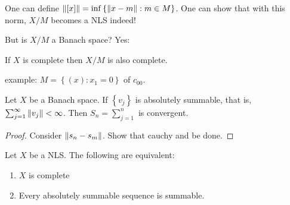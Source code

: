 One can define $\left\lVert [x] \right\rVert = \inf \left\{ \left\lVert x-m \right\rVert : m \in M \right\}$. One can show that with this norm, $X/M$ becomes a NLS indeed!

But is $X/M$ a Banach space? Yes:
\begin{proposition}
    If $X$ is complete then $X/M$ is also complete.
    \label{prop:quotient-are-complete}
\end{proposition}

example: $M=\left\{ \left( x \right) : x_{1} =0 \right\}$ of $c_{00}$.

\begin{lemma}
    Let $X$ be a Banach space. If $\left\{ v_{j} \right\}$ is absolutely summable, that is, $\sum_{j=1}^{\infty} \left\lVert v_{j} \right\rVert < \infty$. Then $S_{n} = \sum_{j=1}^{n}$ is convergent. 
    \label{lemma:Banach-absolutely-summable}
\end{lemma}
\begin{proof}
    Consider $\left\lVert s_{n} - s_{m} \right\rVert$. Show that cauchy and be done.
\end{proof}

\begin{theorem}
    Let $X$ be a NLS. The following are equivalent:
    \begin{enumerate}
	\item $X$ is complete
	\item Every absolutely summable sequence is summable.
    \end{enumerate}
    \label{thm:equivalent-thm}
\end{theorem}
